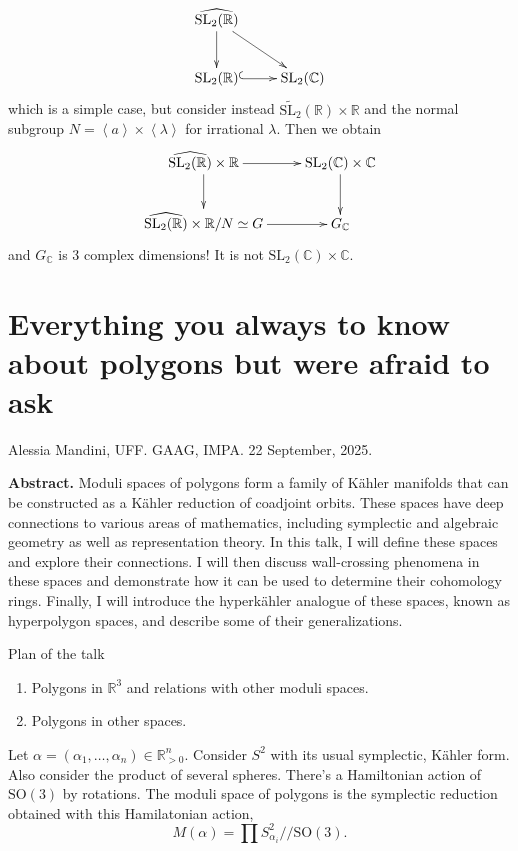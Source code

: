 {\begin{example}
\label{example-complexification-groupoid}
$$
\xymatrix{
\widehat{\text{SL}_2(\mathbb{R})}\ar[d]\ar[dr]\\
\text{SL}_2(\mathbb{R})\ar@{^{(}->}[r]&\text{SL}_2(\mathbb{C})
}
$$
which is a simple case,
but consider instead $\tilde{\text{SL}_2}(\mathbb{R})\times \mathbb{R}$ 
and the normal subgroup $N=\left<a\right>\times \left<\lambda\right>$ 
for irrational $\lambda$. 
Then we obtain
$$
\xymatrix{
\widehat{\text{SL}_2(\mathbb{R})}\times\mathbb{R}\ar[r]\ar[d]
&\text{SL}_2(\mathbb{C})\times\mathbb{C}\ar[d]\\
\widehat{\text{SL}_2(\mathbb{R})}\times\mathbb{R}/N\simeq G\ar[r]&
G_\mathbb{C}
}
$$
and $G_\mathbb{C}$ is 3 complex dimensions! It is not
$\text{SL}_2(\mathbb{C})\times\mathbb{C}$.
\end{example}


\section{Everything you always to know about polygons but were
afraid to ask}
\label{section-everything-you-awlways-wanted-to-know}

\noindent
Alessia Mandini, UFF.
GAAG, IMPA. 
22 September, 2025.

\medskip
{\bf Abstract.} Moduli spaces of polygons form a family of Kähler
manifolds that can be constructed as a Kähler reduction of coadjoint orbits.
These spaces have deep connections to various areas of mathematics, including
symplectic and algebraic geometry as well as representation theory. In this
talk, I will define these spaces and explore their connections. I will then
discuss wall-crossing phenomena in these spaces and demonstrate how it can be
used to determine their cohomology rings. Finally, I will introduce the
hyperkähler analogue of these spaces, known as hyperpolygon spaces, and describe
some of their generalizations.

\medskip\noindent



Plan of the talk
\begin{enumerate}
\item Polygons in $\mathbb{R}^3$ and relations with
other moduli spaces.
\item Polygons in other spaces.
\end{enumerate}

Let $\alpha=(\alpha_1,\ldots,\alpha_n)\in \mathbb{R}^n_{>0}$.
Consider $S^2$ with its usual symplectic, Kähler form.
Also consider the product of several spheres.
There's a Hamiltonian action of $\text{SO}(3)$ by rotations.
The moduli space of polygons is
the symplectic reduction obtained with this
Hamilatonian action,
$$
M(\alpha)=\prod S^2_{\alpha_i}/\!/\text{SO}(3).
$$

}
